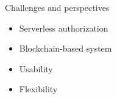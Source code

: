 

\begin{frame}{Challenges and perspectives}
    \begin{itemize}
        \item \alert{Serverless authorization}
        \item \alert{Blockchain-based system}
        \item \alert{Usability}
        \item \alert{Flexibility}
    \end{itemize}
\end{frame}

